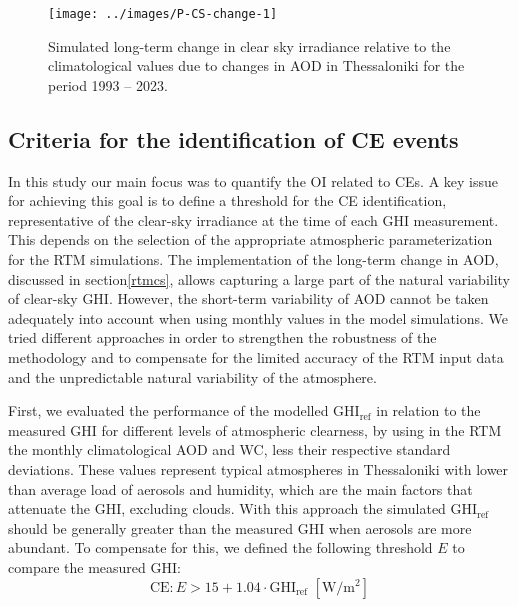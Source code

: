 \documentclass[preprint, 5p,
authoryear]{elsarticle} %
\begin{document}
\begin{figure}

{\centering \texttt{[image: ../images/P-CS-change-1]} 

}

\caption{Simulated long-term change in clear sky irradiance relative to the climatological values due to changes in AOD in Thessaloniki for the period 1993 -- 2023.}\label{fig:CS-change}
\end{figure}

\hypertarget{criteria-for-the-identification-of-ce-events}{%
\subsection{Criteria for the identification of CE
events}\label{criteria-for-the-identification-of-ce-events}}

In this study our main focus was to quantify the OI related to CEs. A
key issue for achieving this goal is to define a threshold for the CE
identification, representative of the clear-sky irradiance at the time
of each GHI measurement. This depends on the selection of the
appropriate atmospheric parameterization for the RTM simulations. The
implementation of the long-term change in AOD, discussed in
section\nobreakspace{}\ref{rtmcs}, allows capturing a large part of the
natural variability of clear-sky GHI. However, the short-term
variability of AOD cannot be taken adequately into account when using
monthly values in the model simulations. We tried different approaches
in order to strengthen the robustness of the methodology and to
compensate for the limited accuracy of the RTM input data and the
unpredictable natural variability of the atmosphere.

First, we evaluated the performance of the modelled
\(\text{GHI}_\text{ref}\) in relation to the measured GHI for different
levels of atmospheric clearness, by using in the RTM the monthly
climatological AOD and WC, less their respective standard deviations.
These values represent typical atmospheres in Thessaloniki with lower
than average load of aerosols and humidity, which are the main factors
that attenuate the GHI, excluding clouds. With this approach the
simulated \(\text{GHI}_\text{ref}\) should be generally greater than the
measured GHI when aerosols are more abundant. To compensate for this, we
defined the following threshold \(E\) to compare the measured
\(\text{GHI}\): \begin{equation}
\text{CE} : E > 15 + 1.04 \cdot \text{GHI}_\text{ref} \,\,[\text{W}/\text{m}^2] \label{eq:CE4}
\end{equation}
\end{document}
